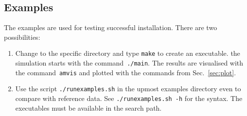 \subsection{\MBSim Examples}
The examples are used for testing successful installation. There are two possibilities:
\begin{enumerate}
\item Change to the specific directory and type \texttt{make} to create an executable. the simulation starts with the command~\texttt{./main}. The results are visualised with the command~\texttt{amvis} and plotted with the commands from Sec.~\ref{sec:plot}.
\item Use the script \texttt{./runexamples.sh} in the upmost examples directory even to compare with reference data. See \texttt{./runexamples.sh -h} for the syntax. The \HDF{} executables must be available in the search path.
\end{enumerate}
